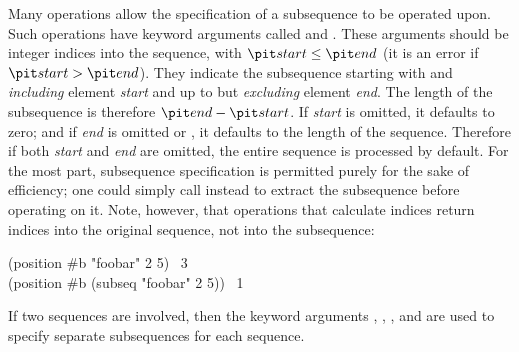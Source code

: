 Many operations allow the specification of a subsequence to be operated
upon.  Such operations have keyword arguments
called  and .  These arguments should be integer indices
into the sequence, with ${\it start}\leq{\it end}$
(it is an error if ${\it start}>{\it end}$).  They indicate
the subsequence starting with and {\it including} element {\it start}
and up to but {\it excluding} element {\it end}.  The length of the subsequence
is therefore ${\it end}-{\it start}$.  If {\it start} is omitted,
it defaults to zero; and if {\it end} is omitted or {\false}, it defaults to
the length of the sequence.
Therefore if both {\it start} and {\it end} are omitted, the entire sequence
is processed by default.
For the most part, subsequence specification
is permitted purely for the sake of efficiency;
one could simply call  instead to extract the subsequence
before operating on it.  Note, however, that operations that
calculate indices
return indices into the original sequence, not into the subsequence:
\begin{lisp}
(position \#{\Xbackslash}b "foobar"  2  5) \EV\ 3 \\
(position \#{\Xbackslash}b (subseq "foobar" 2 5)) \EV\ 1
\end{lisp}
If two sequences are involved, then
the keyword arguments
, , , and  are used to
specify separate subsequences for each sequence.


